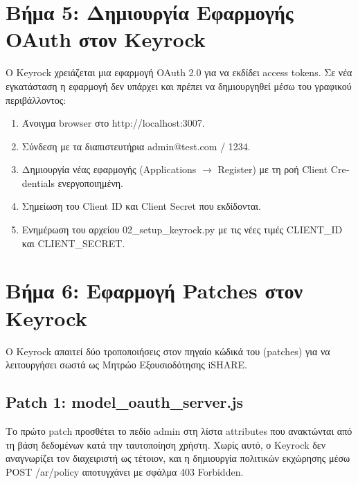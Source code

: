 \section{Βήμα 5: Δημιουργία Εφαρμογής \textlatin{OAuth} στον \textlatin{Keyrock}}
\label{sec:step5-app}

Ο \textlatin{Keyrock} χρειάζεται μια εφαρμογή \textlatin{OAuth 2.0}
για να εκδίδει \textlatin{access tokens}. Σε νέα εγκατάσταση η
εφαρμογή δεν υπάρχει και πρέπει να δημιουργηθεί μέσω του γραφικού
περιβάλλοντος:

\begin{enumerate}
    \item Άνοιγμα \textlatin{browser} στο \textlatin{http://localhost:3007}.
    \item Σύνδεση με τα διαπιστευτήρια \textlatin{admin@test.com} /
    \textlatin{1234}.
    \item Δημιουργία νέας εφαρμογής (\textlatin{Applications} $\rightarrow$
    \textlatin{Register}) με τη ροή \textlatin{Client Credentials}
    ενεργοποιημένη.
    \item Σημείωση του \textlatin{Client ID} και \textlatin{Client
    Secret} που εκδίδονται.
    \item Ενημέρωση του αρχείου \textlatin{02\_setup\_keyrock.py} με
    τις νέες τιμές \textlatin{CLIENT\_ID} και \textlatin{CLIENT\_SECRET}.
\end{enumerate}

\section{Βήμα 6: Εφαρμογή \textlatin{Patches} στον \textlatin{Keyrock}}
\label{sec:step6-patches}

Ο \textlatin{Keyrock} απαιτεί δύο τροποποιήσεις στον πηγαίο κώδικά
του (\textlatin{patches}) για να λειτουργήσει σωστά ως Μητρώο
Εξουσιοδότησης \textlatin{iSHARE}.

\subsection{\textlatin{Patch 1}: \textlatin{model\_oauth\_server.js}}
\label{subsec:patch1}

Το πρώτο \textlatin{patch} προσθέτει το πεδίο \textlatin{admin} στη
λίστα \textlatin{attributes} που ανακτώνται από τη βάση δεδομένων
κατά την ταυτοποίηση χρήστη. Χωρίς αυτό, ο \textlatin{Keyrock} δεν
αναγνωρίζει τον διαχειριστή ως τέτοιον, και η δημιουργία πολιτικών
εκχώρησης μέσω \textlatin{POST /ar/policy} αποτυγχάνει με σφάλμα
\textlatin{403 Forbidden}.

